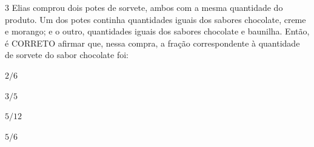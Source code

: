 {%





\num{3}  Elias comprou dois potes de sorvete, ambos com a mesma quantidade do
produto. Um dos potes continha quantidades iguais dos sabores chocolate,
creme e morango; e o outro, quantidades iguais dos sabores chocolate e
baunilha. Então, é CORRETO afirmar que, nessa compra, a fração
correspondente à quantidade de sorvete do sabor chocolate foi:

\begin{escolha}
\item$2/6$ 
\item$3/5$ 
\item$5/12$ 
\item$5/6$
\end{escolha}

}
